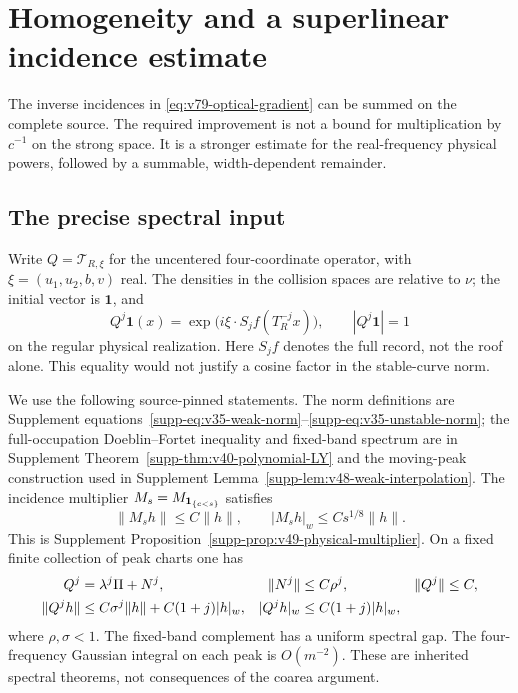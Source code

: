 \section{Homogeneity and a superlinear incidence estimate}
\label{sec:v80-incidence}
The inverse incidences in \eqref{eq:v79-optical-gradient} can be
summed on the complete source. The required improvement is not a
bound for multiplication by $c^{-1}$ on the strong space. It is a
stronger estimate for the real-frequency physical powers, followed
by a summable, width-dependent remainder.

\subsection{The precise spectral input}
Write $Q=\mathscr T_{R,\xi}$ for the uncentered four-coordinate
operator, with $\xi=(u_1,u_2,b,v)$ real. The densities in the
collision spaces are relative to $\nu$; the initial vector is
$\mathbf1$, and
\begin{equation}\label{eq:v80-physical-modulus}
 Q^j\mathbf1(x)=\exp\bigl(i\xi\cdot S_j f(T_R^{-j}x)\bigr),
                  \qquad |Q^j\mathbf1|=1
\end{equation}
on the regular physical realization. Here $S_jf$ denotes the full
record, not the roof alone. This equality would not justify a
cosine factor in the stable-curve norm.

We use the following source-pinned statements. The norm definitions
are Supplement equations~\eqref{supp-eq:v35-weak-norm}--\eqref{supp-eq:v35-unstable-norm};
the full-occupation Doeblin--Fortet inequality and fixed-band spectrum
are in Supplement Theorem~\ref{supp-thm:v40-polynomial-LY} and the
moving-peak construction used in Supplement
Lemma~\ref{supp-lem:v48-weak-interpolation}. The incidence multiplier
$M_s=M_{\mathbf1_{\{c<s\}}}$ satisfies
\begin{equation}\label{eq:v80-inherited-multiplier}
 \|M_s h\|\le C\|h\|,\qquad
 |M_s h|_w\le Cs^{1/8}\|h\|.
\end{equation}
This is Supplement Proposition~\ref{supp-prop:v49-physical-multiplier}.
On a fixed finite collection of peak charts one has
\begin{align}
 Q^j&=\lambda^j\Pi+N^j,&\|N^j\|&\le C\rho^j,&\|Q^j\|&\le C,
                                                        \notag\\
 \|Q^j h\|&\le C\sigma^j\|h\|+C(1+j)|h|_w,&
 |Q^j h|_w&\le C(1+j)|h|_w,                  \label{eq:v80-spectral-input}
\end{align}
where $\rho,\sigma<1$. The fixed-band complement has a uniform
spectral gap. The four-frequency Gaussian integral on each peak is
$O(m^{-2})$. These are inherited spectral theorems, not consequences
of the coarea argument.

